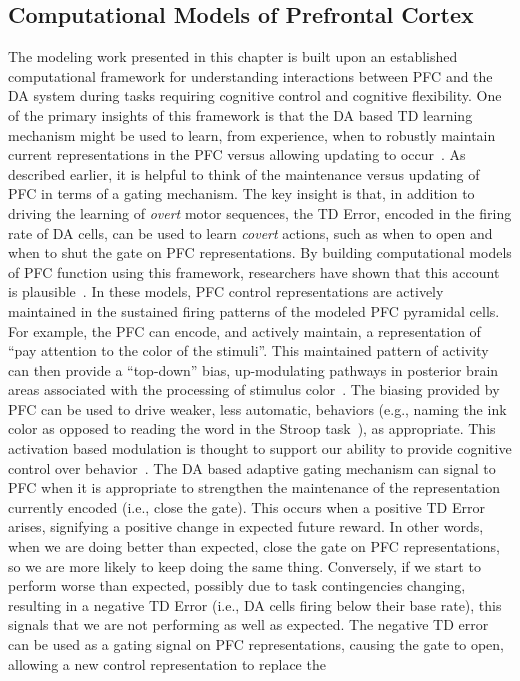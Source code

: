 


\subsection{Computational Models of Prefrontal Cortex}
The modeling work presented in this chapter is built upon an established computational framework for understanding interactions between PFC and the DA system during tasks requiring cognitive control and cognitive flexibility. One of the primary insights of this framework is that the DA based TD learning mechanism might be used to learn, from experience, when to robustly maintain current representations in the PFC versus allowing updating to occur~\cite{BraverTS:2000:Control}. As described earlier, it is helpful to think of the maintenance versus updating of PFC in terms of a gating mechanism. The key insight is that, in addition to driving the learning of \emph{overt} motor sequences, the TD Error, encoded in the firing rate of DA cells, can be used to learn \emph{covert} actions, such as when to open and when to shut the gate on PFC representations. By building computational models of PFC function using this framework, researchers have shown that this account is plausible~\cite{BraverTS:2000:Control,OReillyRC:2002:IDED}. In these models, PFC control representations are actively maintained in the sustained firing patterns of the modeled PFC pyramidal cells. For example, the PFC can encode, and actively maintain, a representation of ``pay attention to the color of the stimuli''. This maintained pattern of activity can then provide a ``top-down'' bias, up-modulating pathways in posterior brain areas associated with the processing of stimulus color~\cite{CohenJD:1990:Stroop}. The biasing provided by PFC can be used to drive weaker, less automatic, behaviors (e.g., naming the ink color as opposed to reading the word in the Stroop task~\cite{StroopJR:1935:Interference}), as appropriate. This activation based modulation is thought to support our ability to provide cognitive control over behavior~\cite{CohenJD:1992:Schizophrenia,MillerEK:2001:PFC}. The DA based adaptive gating mechanism can signal to PFC when it is appropriate to strengthen the maintenance of the representation currently encoded (i.e., close the gate). This occurs when a positive TD Error arises, signifying a positive change in expected future reward. In other words, when we are doing better than expected, close the gate on PFC representations, so we are more likely to keep doing the same thing. Conversely, if we start to perform worse than expected, possibly due to task contingencies changing, resulting in a negative TD Error (i.e., DA cells firing below their base rate), this signals that we are not performing as well as expected. The negative TD error can be used as a gating signal on PFC representations, causing the gate to open, allowing a new control representation to replace the 